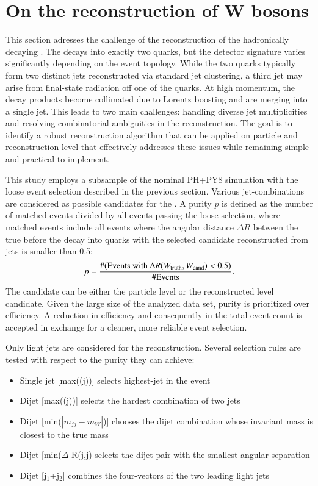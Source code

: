 \section{On the reconstruction of W bosons}
\label{sec:Wreconstruction}
This section adresses the challenge of the reconstruction of the hadronically decaying \Wboson.
The \Wboson decays into exactly two quarks, but the
detector signature varies significantly depending on the event topology. 
While the two quarks typically form two distinct jets reconstructed via standard jet clustering, 
a third jet may arise from final-state radiation off one of the quarks. 
At high \Wboson momentum, the decay products become collimated due to Lorentz boosting and are merging into a single jet.
This leads to two main challenges: handling diverse jet multiplicities and resolving combinatorial ambiguities in the reconstruction.
The goal is to identify a robust reconstruction algorithm that can be applied on particle and reconstruction level
that effectively addresses these issues while remaining simple and practical to implement.

This study employs a subsample of the nominal PH+PY8 \ttbar simulation with the loose event selection described in the previous section.
Various jet-combinations are considered as possible candidates for the \Wboson.
A purity $p$ is defined as the number of matched events divided by all events passing the loose selection, where
matched events include all events where the angular distance $\Delta R$ between the true \Wboson before the decay into quarks \Wtruth
with the selected candidate reconstructed from jets \Wcand is smaller than 0.5:
\begin{equation}
	p = \frac{\#(\text{Events with}~ \Delta R(W_\mathrm{truth}, W_\mathrm{cand})<0.5)}{\#\text{Events}}.
    \label{eq:Wpurity}
\end{equation}
The candidate can be either the particle level or the reconstructed level candidate.
Given the large size of the analyzed data set, purity is prioritized over efficiency. 
A reduction in efficiency and consequently in the total event count is accepted in exchange for a cleaner, more reliable event selection.

Only light jets are considered for the reconstruction.
Several selection rules are tested with respect to the purity they can achieve:
\begin{itemize}
    \item Single jet [max(\pt(j))] selects highest-\pt jet in the event
    \item Dijet [max(\pt(j))] selects the hardest combination of two jets
    \item Dijet [min($|m_{jj}-m_W|$)] chooses the dijet combination whose invariant mass is closest to the true \Wboson mass
    \item Dijet [min($\Delta$ R(j,j) selects the dijet pair with the smallest angular separation
    \item Dijet [j$_1$+j$_2$] combines the four-vectors of the two leading light jets
\end{itemize}

